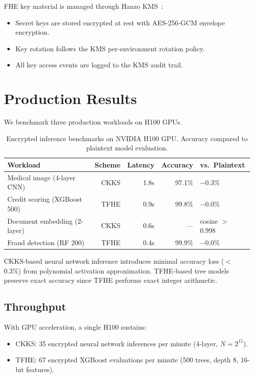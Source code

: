 \documentclass[11pt]{article}
\begin{document}
FHE key material is managed through Hanzo KMS~\cite{hanzokms}:
\begin{itemize}[leftmargin=1.1em]
    \item Secret keys are stored encrypted at rest with AES-256-GCM envelope
    encryption.
    \item Key rotation follows the KMS per-environment rotation policy.
    \item All key access events are logged to the KMS audit trail.
\end{itemize}

\section{Production Results}
\label{sec:results}

We benchmark three production workloads on H100 GPUs.

\begin{table}[H]
\centering
\small
\begin{tabular}{lrrrl}
\toprule
\textbf{Workload} & \textbf{Scheme} & \textbf{Latency} & \textbf{Accuracy} & \textbf{vs.\ Plaintext} \\
\midrule
Medical image (4-layer CNN) & CKKS & 1.8s & 97.1\% & $-$0.3\% \\
Credit scoring (XGBoost 500) & TFHE & 0.9s & 99.8\% & $-$0.0\% \\
Document embedding (2-layer) & CKKS & 0.6s & --- & cosine $>$ 0.998 \\
Fraud detection (RF 200) & TFHE & 0.4s & 99.9\% & $-$0.0\% \\
\bottomrule
\end{tabular}
\caption{Encrypted inference benchmarks on NVIDIA H100 GPU. Accuracy compared
to plaintext model evaluation.}
\label{tab:benchmarks}
\end{table}

CKKS-based neural network inference introduces minimal accuracy loss ($<$0.3\%)
from polynomial activation approximation. TFHE-based tree models preserve exact
accuracy since TFHE performs exact integer arithmetic.

\subsection{Throughput}

With GPU acceleration, a single H100 sustains:
\begin{itemize}[leftmargin=1.1em]
    \item CKKS: 35 encrypted neural network inferences per minute (4-layer,
    $N = 2^{15}$).
    \item TFHE: 67 encrypted XGBoost evaluations per minute (500 trees,
    depth 8, 16-bit features).
\end{itemize}
\end{document}
